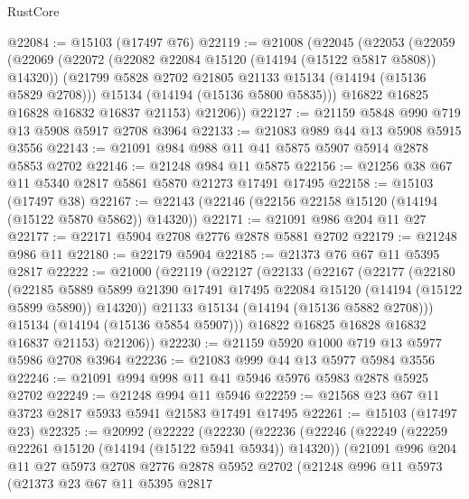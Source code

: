 \begin{lexlean}{RustCore}
\begin{coremodule}
@22084 := @15103 (@17497 @76)
@22119 := @21008
    (@22045
      (@22053
        (@22059
          (@22069
            (@22072 (@22082 @22084 @15120 (@14194 (@15122 @5817 @5808)) @14320))
            (@21799 @5828 @2702 @21805 @21133 @15134 (@14194 (@15136 @5829 @2708)))
            @15134
            (@14194 (@15136 @5800 @5835)))
          @16822
          @16825
          @16828
          @16832
          @16837
          @21153)
        @21206))
@22127 := @21159 @5848 @990 @719 @13 @5908 @5917 @2708 @3964
@22133 := @21083 @989 @44 @13 @5908 @5915 @3556
@22143 := @21091 @984 @988 @11 @41 @5875 @5907 @5914 @2878 @5853 @2702
@22146 := @21248 @984 @11 @5875
@22156 := @21256 @38 @67 @11 @5340 @2817 @5861 @5870 @21273 @17491 @17495
@22158 := @15103 (@17497 @38)
@22167 := @22143 (@22146 (@22156 @22158 @15120 (@14194 (@15122 @5870 @5862)) @14320))
@22171 := @21091 @986 @204 @11 @27
@22177 := @22171 @5904 @2708 @2776 @2878 @5881 @2702
@22179 := @21248 @986 @11
@22180 := @22179 @5904
@22185 := @21373 @76 @67 @11 @5395 @2817
@22222 := @21000
    (@22119
      (@22127
        (@22133
          (@22167
            (@22177
              (@22180
                (@22185
                  @5889
                  @5899
                  @21390
                  @17491
                  @17495
                  @22084
                  @15120
                  (@14194 (@15122 @5899 @5890))
                  @14320))
              @21133
              @15134
              (@14194 (@15136 @5882 @2708)))
            @15134
            (@14194 (@15136 @5854 @5907)))
          @16822
          @16825
          @16828
          @16832
          @16837
          @21153)
        @21206))
@22230 := @21159 @5920 @1000 @719 @13 @5977 @5986 @2708 @3964
@22236 := @21083 @999 @44 @13 @5977 @5984 @3556
@22246 := @21091 @994 @998 @11 @41 @5946 @5976 @5983 @2878 @5925 @2702
@22249 := @21248 @994 @11 @5946
@22259 := @21568 @23 @67 @11 @3723 @2817 @5933 @5941 @21583 @17491 @17495
@22261 := @15103 (@17497 @23)
@22325 := @20992
    (@22222
      (@22230
        (@22236
          (@22246
            (@22249 (@22259 @22261 @15120 (@14194 (@15122 @5941 @5934)) @14320))
            (@21091
              @996
              @204
              @11
              @27
              @5973
              @2708
              @2776
              @2878
              @5952
              @2702
              (@21248
                @996
                @11
                @5973
                (@21373
                  @23
                  @67
                  @11
                  @5395
                  @2817

\end{coremodule}
\end{lexlean}
